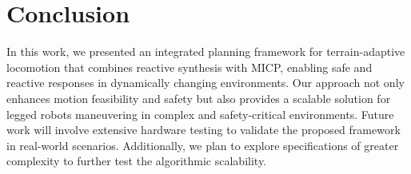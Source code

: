 \documentclass[letterpaper, 10 pt, conference]{ieeeconf}
\begin{document}
\section{Conclusion}
In this work, we presented an integrated planning framework for terrain-adaptive locomotion that combines reactive synthesis with MICP, enabling safe and reactive responses in dynamically changing environments. 
Our approach not only enhances motion feasibility and safety but also provides a scalable solution for legged robots maneuvering in complex and safety-critical environments. Future work will involve extensive hardware testing to validate the proposed framework in real-world scenarios. Additionally, we plan to explore specifications of greater complexity to further test the algorithmic scalability.



\end{document}
